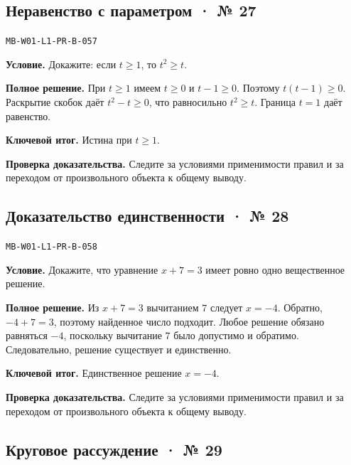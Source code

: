 \documentclass[11pt,a4paper,openany]{book}
\newcommand{\muid}[1]{\texttt{\footnotesize #1}}
\begin{document}
\subsection*{Неравенство с параметром · № 27}\hypertarget{solution:MB-W01-L1-PR-B-057}{}

\muid{MB-W01-L1-PR-B-057}\par

\textbf{Условие.} Докажите: если $t\ge1$, то $t^2\ge t$.\par

\textbf{Полное решение.} При $t\ge1$ имеем $t\ge0$ и $t-1\ge0$. Поэтому $t(t-1)\ge0$. Раскрытие скобок даёт $t^2-t\ge0$, что равносильно $t^2\ge t$. Граница $t=1$ даёт равенство.


\begin{learnbox}\textbf{Ключевой итог.} Истина при $t\ge1$.\par \textbf{Проверка доказательства.} 
Следите за условиями применимости правил и за переходом от произвольного объекта к общему выводу. 
\end{learnbox}

\subsection*{Доказательство единственности · № 28}\hypertarget{solution:MB-W01-L1-PR-B-058}{}

\muid{MB-W01-L1-PR-B-058}\par

\textbf{Условие.} Докажите, что уравнение $x+7=3$ имеет ровно одно вещественное решение.\par

\textbf{Полное решение.} Из $x+7=3$ вычитанием $7$ следует $x=-4$. Обратно, $-4+7=3$, поэтому найденное число подходит. Любое решение обязано равняться $-4$, поскольку вычитание $7$ было допустимо и обратимо. Следовательно, решение существует и единственно.


\begin{learnbox}\textbf{Ключевой итог.} Единственное решение $x=-4$.\par \textbf{Проверка доказательства.} 
Следите за условиями применимости правил и за переходом от произвольного объекта к общему выводу. 
\end{learnbox}

\subsection*{Круговое рассуждение · № 29}\hypertarget{solution:MB-W01-L1-PR-B-059}{}
\end{document}
